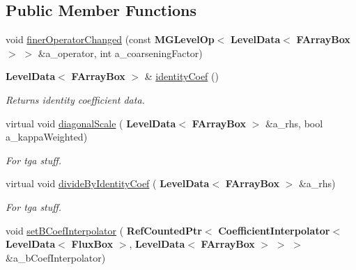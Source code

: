 \subsection*{Public Member Functions}
\begin{DoxyCompactItemize}
\item 
void \hyperlink{class_darcy_brinkman_op_ac6da9fd6f61b40c42b3a94b645c21e35}{finer\+Operator\+Changed} (const \textbf{ M\+G\+Level\+Op}$<$ \textbf{ Level\+Data}$<$ \textbf{ F\+Array\+Box} $>$ $>$ \&a\+\_\+operator, int a\+\_\+coarsening\+Factor)
\item 
\mbox{\label{class_darcy_brinkman_op_a27d3f026aea19d8b7f14f6801d4fb479}} 
\textbf{ Level\+Data}$<$ \textbf{ F\+Array\+Box} $>$ \& \hyperlink{class_darcy_brinkman_op_a27d3f026aea19d8b7f14f6801d4fb479}{identity\+Coef} ()
\begin{DoxyCompactList}\small\item\em Returns identity coefficient data. \end{DoxyCompactList}\item 
\mbox{\label{class_darcy_brinkman_op_a4c661019f1436c2d7f68e6d7ec8a216c}} 
virtual void \hyperlink{class_darcy_brinkman_op_a4c661019f1436c2d7f68e6d7ec8a216c}{diagonal\+Scale} (\textbf{ Level\+Data}$<$ \textbf{ F\+Array\+Box} $>$ \&a\+\_\+rhs, bool a\+\_\+kappa\+Weighted)
\begin{DoxyCompactList}\small\item\em For tga stuff. \end{DoxyCompactList}\item 
\mbox{\label{class_darcy_brinkman_op_a6b3aa7b8af250978e180b477a9037061}} 
virtual void \hyperlink{class_darcy_brinkman_op_a6b3aa7b8af250978e180b477a9037061}{divide\+By\+Identity\+Coef} (\textbf{ Level\+Data}$<$ \textbf{ F\+Array\+Box} $>$ \&a\+\_\+rhs)
\begin{DoxyCompactList}\small\item\em For tga stuff. \end{DoxyCompactList}\item 
void \hyperlink{class_darcy_brinkman_op_a291dd090a4475bcb95fe2901722660c9}{set\+B\+Coef\+Interpolator} (\textbf{ Ref\+Counted\+Ptr}$<$ \textbf{ Coefficient\+Interpolator}$<$ \textbf{ Level\+Data}$<$ \textbf{ Flux\+Box} $>$, \textbf{ Level\+Data}$<$ \textbf{ F\+Array\+Box} $>$ $>$ $>$ \&a\+\_\+b\+Coef\+Interpolator)

\end{DoxyCompactItemize}
